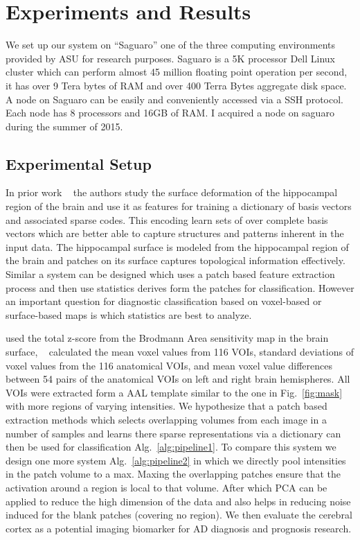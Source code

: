 \chapter{Experiments and Results} %
We set up our system  on ``Saguaro'' one of the three computing environments provided by ASU for research purposes. Saguaro is a 5K processor Dell Linux cluster which can perform almost 45 million floating point operation per second, it has over 9 Tera bytes of RAM and over 400 Terra Bytes aggregate disk space. A node on Saguaro can be easily and conveniently accessed via a SSH protocol. Each node has 8 processors and 16GB of RAM. I acquired a node on saguaro during the summer of 2015.

\section{Experimental Setup}
In prior work ~\cite{zhang2016applying} the authors study the surface deformation of the hippocampal region of the brain and use it as features for training a dictionary of basis vectors and associated sparse codes. This encoding learn sets of over complete basis vectors which are better able to capture structures and patterns inherent in the input data. The hippocampal surface is modeled from the hippocampal region of the brain and patches on its surface captures topological information effectively. Similar a system can be designed which uses a patch based feature extraction process and then use statistics derives form the patches for classification. However an important question for diagnostic classification based on voxel-based or surface-based maps is which statistics are best to analyze. 

\citep{kakimoto2011new} used the total z-score from the Brodmann Area sensitivity map in the brain surface, ~\citep{lu2017early} calculated the mean voxel values from 116 VOIs, standard deviations of voxel values from the 116 anatomical VOIs, and mean voxel value differences between 54 pairs of the anatomical VOIs on left and right brain hemispheres. All VOIs were extracted form a AAL template similar to the one in Fig.~\ref{fig:mask} with more regions of varying intensities. We hypothesize that a patch based extraction methods which selects overlapping volumes from each image in a number of samples and learns there sparse representations via a dictionary can then be used for classification Alg.~\ref{alg:pipeline1}. To compare this system we design one more system Alg.~\ref{alg:pipeline2} in which we directly pool intensities in the patch volume to a max. Maxing the overlapping patches ensure that the activation around a region is local to that volume. After which PCA can be applied to reduce the high dimension of the data and also helps in reducing noise induced for the blank patches (covering no region). We then evaluate the cerebral cortex as a potential imaging biomarker for AD diagnosis and prognosis research.  

